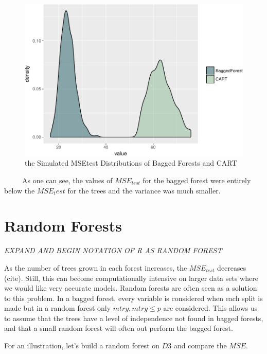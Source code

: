 \documentclass[12pt,twoside]{reedthesis}
\begin{document}
  \begin{figure}[htbp]
  \centering
  \includegraphics{Thesis_files/figure-latex/baggedvcart-1.pdf}
  \caption{\label{fig:baggedvcart}the Simulated MSEtest Distributions of
  Bagged Forests and CART}
  \end{figure}
  
  ~~~~~As one can see, the values of \(MSE_{test}\) for the bagged forest
  were entirely below the \(MSE_test\) for the trees and the variance was
  much smaller.
  
  \section{Random Forests}\label{random-forests}
  
  \emph{EXPAND AND BEGIN NOTATION OF R AS RANDOM FOREST}
  
  As the number of trees grown in each forest increases, the
  \(MSE_{test}\) decreases (cite). Still, this can become computationally
  intensive on larger data sets where we would like very accurate models.
  Random forests are often seen as a solution to this problem. In a bagged
  forest, every variable is considered when each split is made but in a
  random forest only \(mtry, mtry \leq p\) are considered. This allows us
  to assume that the trees have a level of independence not found in
  bagged forests, and that a small random forest will often out perform
  the bagged forest.
  
  For an illustration, let's build a random forest on \(D3\) and compare
  the \(MSE\).
  
\end{document}
